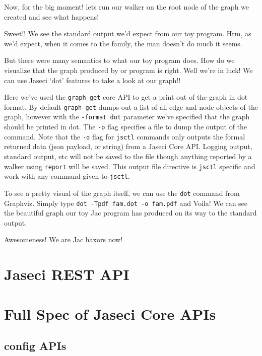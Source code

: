 \par
Now, for the big moment! lets run our walker on the root node of the graph we created and see what happens!
\par
{}
\par
Sweet!! We see the standard output we'd expect from our toy program. Hrm, as we'd expect, when it comes to the family, the man doesn't do much it seems.
\par
But there were many semantics to what our toy program does. How do we visualize that the graph produced by or program is right. Well we're in luck! We can use Jaseci `dot' features to take a look at our graph!!
\par
{}
\par
{}
Here we've used the \texttt{graph get} core API to get a print out of the graph in dot format. By default \texttt{graph get} dumps out a list of all edge and node objects of the graph, however with the \texttt{-format dot} parameter we've specified that the graph should be printed in dot. The \texttt{-o} flag specifies a file to dump the output of the command. Note that the \texttt{-o} flag for \texttt{jsctl} commands only outputs the formal returned data (json payload, or string) from a Jaseci Core API. Logging output, standard output, etc will not be saved to the file though anything reported by a walker using \texttt{report} will be saved. This output file directive is \texttt{jsctl} specific and work with any command given to \texttt{jsctl}.
\par
To see a pretty visual of the graph itself, we can use the \texttt{dot} command from Graphviz. Simply type \texttt{dot -Tpdf fam.dot -o fam.pdf} and Voila! We can see the beautiful graph our toy Jac program has produced on its way to the standard output.
\par
Awesomeness! We are Jac \Gls{haxor}s now!

\section{Jaseci REST API}

\section{Full Spec of Jaseci Core APIs}
\subsection{config APIs}
